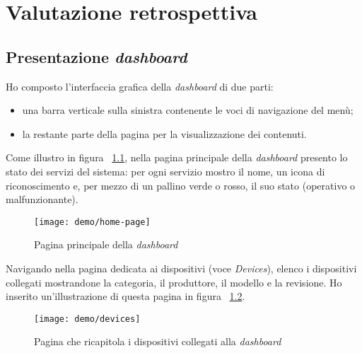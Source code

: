 
\pagebreak
\chapter{Valutazione retrospettiva}
\label{cap:analisi-requisiti}

\section{Presentazione \emph{dashboard}}

Ho composto l'interfaccia grafica della \emph{dashboard} di due parti:
\begin{itemize}
  \item una barra verticale sulla sinistra contenente le voci di navigazione del menù;
  \item la restante parte della pagina per la visualizzazione dei contenuti.
\end{itemize}
Come illustro in figura ~\ref{fig:homepage}, nella pagina principale della \emph{dashboard} presento lo stato dei servizi del sistema: per ogni servizio mostro il nome, un icona di riconoscimento e, per mezzo di un pallino verde o rosso, il suo stato (operativo o malfunzionante).

\begin{figure}[!h]
    \centering
    \texttt{[image: demo/home-page]}
    \caption{Pagina principale della \emph{dashboard}}
    \label{fig:homepage}
\end{figure}

Navigando nella pagina dedicata ai dispositivi (voce \emph{Devices}), elenco i dispositivi collegati mostrandone la categoria, il produttore, il modello e la revisione. Ho inserito un'illustrazione di questa pagina in figura ~\ref{fig:devices}.

\begin{figure}[!h]
    \centering
    \texttt{[image: demo/devices]}
    \caption{Pagina che ricapitola i dispositivi collegati alla \emph{dashboard}}
    \label{fig:devices}
\end{figure}

